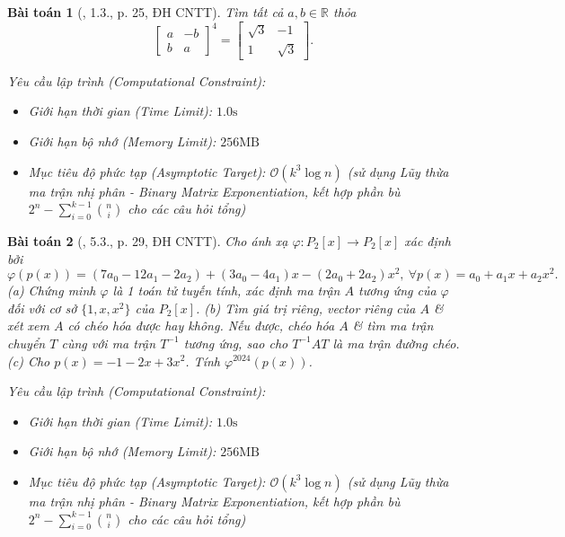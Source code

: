 \documentclass{article}
\newtheorem{baitoan}{Bài toán}
\begin{document}
\begin{baitoan}[\cite{VMS_VMC2024}, 1.3., p. 25, ĐH CNTT]
	Tìm tất cả $a,b\in\mathbb{R}$ thỏa
	\begin{equation*}
		\begin{bmatrix}
			a & -b\\b & a
		\end{bmatrix}^4 = \begin{bmatrix}
			\sqrt{3} & -1\\1 & \sqrt{3}
		\end{bmatrix}.
	\end{equation*}

    \vspace{0.5em}
    \emph{Yêu cầu lập trình (Computational Constraint):}
    \begin{itemize}
        \item Giới hạn thời gian (Time Limit): $1.0\mathrm{s}$
        \item Giới hạn bộ nhớ (Memory Limit): $256\mathrm{MB}$
        \item Mục tiêu độ phức tạp (Asymptotic Target): $\mathcal{O}(k^3 \log n)$ (sử dụng Lũy thừa ma trận nhị phân - Binary Matrix Exponentiation, kết hợp phần bù $2^n - \sum_{i=0}^{k-1} \binom{n}{i}$ cho các câu hỏi tổng)
    \end{itemize}
\end{baitoan}


\begin{baitoan}[\cite{VMS_VMC2024}, 5.3., p. 29, ĐH CNTT]
	Cho ánh xạ $\varphi:P_2[x]\to P_2[x]$ xác định bởi
	\begin{equation*}
		\varphi(p(x)) = (7a_0 - 12a_1 - 2a_2) + (3a_0 - 4a_1)x - (2a_0 + 2a_2)x^2,\ \forall p(x) = a_0 + a_1x + a_2x^2.
	\end{equation*}
	(a) Chứng minh $\varphi$ là 1 toán tử tuyến tính, xác định ma trận $A$ tương ứng của $\varphi$ đối với cơ sở $\{1,x,x^2\}$ của $P_2[x]$. (b) Tìm giá trị riêng, vector riêng của $A$ \& xét xem $A$ có chéo hóa được hay không. Nếu được, chéo hóa $A$ \& tìm ma trận chuyển $T$ cùng với ma trận $T^{-1}$ tương ứng, sao cho $T^{-1}AT$ là ma trận đường chéo. (c) Cho $p(x) = -1 - 2x + 3x^2$. Tính $\varphi^{2024}(p(x))$.

    \vspace{0.5em}
    \emph{Yêu cầu lập trình (Computational Constraint):}
    \begin{itemize}
        \item Giới hạn thời gian (Time Limit): $1.0\mathrm{s}$
        \item Giới hạn bộ nhớ (Memory Limit): $256\mathrm{MB}$
        \item Mục tiêu độ phức tạp (Asymptotic Target): $\mathcal{O}(k^3 \log n)$ (sử dụng Lũy thừa ma trận nhị phân - Binary Matrix Exponentiation, kết hợp phần bù $2^n - \sum_{i=0}^{k-1} \binom{n}{i}$ cho các câu hỏi tổng)
    \end{itemize}
\end{baitoan}
\end{document}
